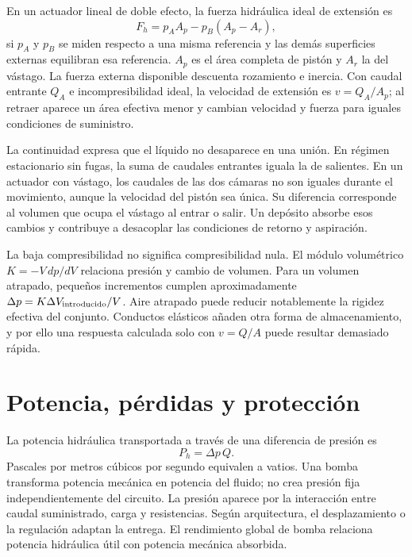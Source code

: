En un actuador lineal de doble efecto, la fuerza hidráulica ideal de extensión es
\begin{equation}
 F_h=p_AA_p-p_B(A_p-A_r),
\end{equation}
si $p_A$ y $p_B$ se miden respecto a una misma referencia y las demás superficies externas equilibran esa referencia. $A_p$ es el área completa de pistón y $A_r$ la del vástago. La fuerza externa disponible descuenta rozamiento e inercia. Con caudal entrante $Q_A$ e incompresibilidad ideal, la velocidad de extensión es $v=Q_A/A_p$; al retraer aparece un área efectiva menor y cambian velocidad y fuerza para iguales condiciones de suministro.

La continuidad expresa que el líquido no desaparece en una unión. En régimen estacionario sin fugas, la suma de caudales entrantes iguala la de salientes. En un actuador con vástago, los caudales de las dos cámaras no son iguales durante el movimiento, aunque la velocidad del pistón sea única. Su diferencia corresponde al volumen que ocupa el vástago al entrar o salir. Un depósito absorbe esos cambios y contribuye a desacoplar las condiciones de retorno y aspiración.

La baja compresibilidad no significa compresibilidad nula. El módulo volumétrico $K=-V\,dp/dV$ relaciona presión y cambio de volumen. Para un volumen atrapado, pequeños incrementos cumplen aproximadamente $\Delta p=K\Delta V_{\rm introducido}/V$. Aire atrapado puede reducir notablemente la rigidez efectiva del conjunto. Conductos elásticos añaden otra forma de almacenamiento, y por ello una respuesta calculada solo con $v=Q/A$ puede resultar demasiado rápida.

\section{Potencia, pérdidas y protección}
La potencia hidráulica transportada a través de una diferencia de presión es
\begin{equation}
 P_h=\Delta p\,Q.
\end{equation}
Pascales por metros cúbicos por segundo equivalen a vatios. Una bomba transforma potencia mecánica en potencia del fluido; no crea presión fija independientemente del circuito. La presión aparece por la interacción entre caudal suministrado, carga y resistencias. Según arquitectura, el desplazamiento o la regulación adaptan la entrega. El rendimiento global de bomba relaciona potencia hidráulica útil con potencia mecánica absorbida.

